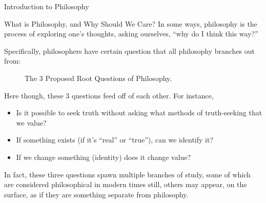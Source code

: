 \begin{chapter}{Introduction to Philosophy}
\begin{section}{What is Philosophy, and Why Should We Care?}
        In some ways, philosophy is the process of exploring one’s thoughts, asking ourselves, “why do I think this way?”
            
        Specifically, philosophers have certain question that all philosophy branches out from:
            
        \begin{figure}[ht]
            \centering
            \caption{The 3 Proposed Root Questions of Philosophy.}
            \label{fig:ThreePhilosophicalQuestions}
        \end{figure}
            
        Here though, these 3 questions feed off of each other. For instance, 
        \begin{itemize}
            \item Is it possible to seek truth without asking what methods of truth-seeking that we value?
                
            \item If something exists (if it’s “real” or “true”), can we identify it?
                
            \item If we change something (identity) does it change value?
        \end{itemize}
            
        In fact, these three questions spawn multiple branches of study, some of which are considered philosophical in modern times still, others may appear, on the surface, as if they are something separate from philosophy.
            

\end{section}
\end{chapter}
